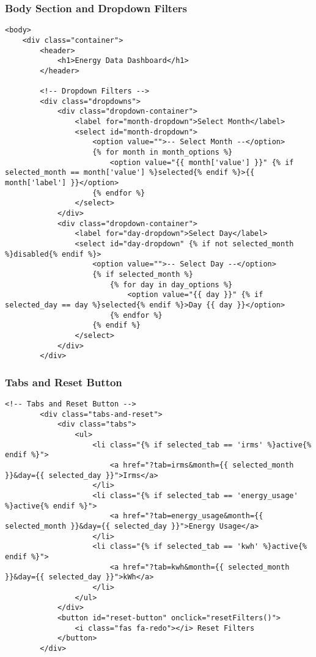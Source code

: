 \subsubsection{Body Section and Dropdown Filters}
\begin{lstlisting}[style=HTML, caption={Body Section and Dropdown Filters}]
<body>
    <div class="container">
        <header>
            <h1>Energy Data Dashboard</h1>
        </header>

        <!-- Dropdown Filters -->
        <div class="dropdowns">
            <div class="dropdown-container">
                <label for="month-dropdown">Select Month</label>
                <select id="month-dropdown">
                    <option value="">-- Select Month --</option>
                    {% for month in month_options %}
                        <option value="{{ month['value'] }}" {% if selected_month == month['value'] %}selected{% endif %}>{{ month['label'] }}</option>
                    {% endfor %}
                </select>
            </div>
            <div class="dropdown-container">
                <label for="day-dropdown">Select Day</label>
                <select id="day-dropdown" {% if not selected_month %}disabled{% endif %}>
                    <option value="">-- Select Day --</option>
                    {% if selected_month %}
                        {% for day in day_options %}
                            <option value="{{ day }}" {% if selected_day == day %}selected{% endif %}>Day {{ day }}</option>
                        {% endfor %}
                    {% endif %}
                </select>
            </div>
        </div>
\end{lstlisting}

\subsubsection{Tabs and Reset Button}
\begin{lstlisting}[style=HTML, caption={Tabs and Reset Button}]
        <!-- Tabs and Reset Button -->
        <div class="tabs-and-reset">
            <div class="tabs">
                <ul>
                    <li class="{% if selected_tab == 'irms' %}active{% endif %}">
                        <a href="?tab=irms&month={{ selected_month }}&day={{ selected_day }}">Irms</a>
                    </li>
                    <li class="{% if selected_tab == 'energy_usage' %}active{% endif %}">
                        <a href="?tab=energy_usage&month={{ selected_month }}&day={{ selected_day }}">Energy Usage</a>
                    </li>
                    <li class="{% if selected_tab == 'kwh' %}active{% endif %}">
                        <a href="?tab=kwh&month={{ selected_month }}&day={{ selected_day }}">kWh</a>
                    </li>
                </ul>
            </div>
            <button id="reset-button" onclick="resetFilters()">
                <i class="fas fa-redo"></i> Reset Filters
            </button>
        </div>
\end{lstlisting}

